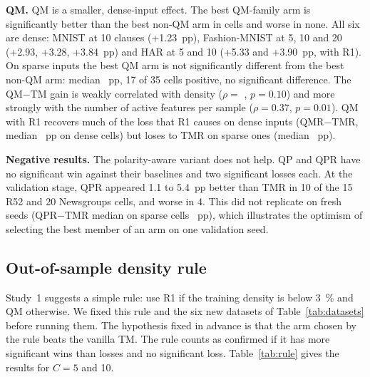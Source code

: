 \documentclass[preprint,12pt,times]{elsarticle}
\begin{document}
\textbf{QM.} QM is a smaller, dense-input effect.
The best QM-family arm is significantly better than the best non-QM arm in \numBwin{} cells and worse in none.
All six are dense: MNIST at 10 clauses (+1.23~pp), Fashion-MNIST at 5, 10 and 20 (+2.93, +3.28, +3.84~pp) and HAR at 5 and 10 (+5.33 and +3.90~pp, with R1).
On sparse inputs the best QM arm is not significantly different from the best non-QM arm: median \numBmedsparse{}~pp, 17 of 35 cells positive, no significant difference.
The QM$-$TM gain is weakly correlated with density ($\rho = $ \numQrho{}, $p = 0.10$) and more strongly with the number of active features per sample ($\rho = 0.37$, $p = 0.01$).
QM with R1 recovers much of the loss that R1 causes on dense inputs (QMR$-$TMR, median \numQRmeddense{}~pp on dense cells) but loses to TMR on sparse ones (median \numQRmedsparse{}~pp).

\textbf{Negative results.} The polarity-aware variant does not help.
QP and QPR have no significant win against their baselines and two significant losses each.
At the validation stage, QPR appeared 1.1 to 5.4~pp better than TMR in 10 of the 15 R52 and 20 Newsgroups cells, and worse in 4.
This did not replicate on fresh seeds (QPR$-$TMR median on sparse cells \numPRmedsparse{}~pp), which illustrates the optimism of selecting the best member of an arm on one validation seed.

\subsection{Out-of-sample density rule}
\label{sec:res-rule}
Study~1 suggests a simple rule: use R1 if the training density is below \SI{3}{\percent} and QM otherwise.
We fixed this rule and the six new datasets of Table~\ref{tab:datasets} before running them.
The hypothesis fixed in advance is that the arm chosen by the rule beats the vanilla TM.
The rule counts as confirmed if it has more significant wins than losses and no significant loss.
Table~\ref{tab:rule} gives the results for $C = 5$ and 10.

\begin{table}[!htbp]
\centering
\caption{Out-of-sample density rule on six datasets not used in study~1 (test accuracy, mean of five seeds). Rule: R1 (TMR) below \SI{3}{\percent} density, QM otherwise. $\Delta$ rule: rule arm minus TM. $\Delta$ other: the other family minus TM, for reference. Bold: significant after Holm correction over the 12 cells of the respective contrast.}
\label{tab:rule}
\footnotesize
\setlength{\tabcolsep}{5pt}

\end{table}
\end{document}

